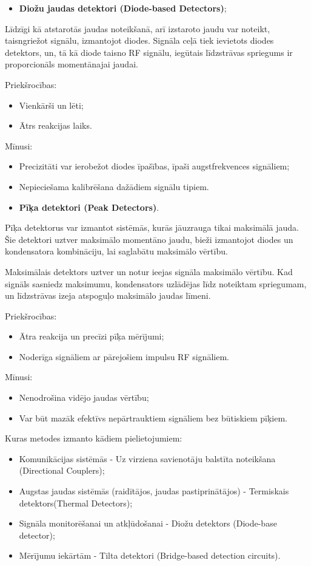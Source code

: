 \begin{itemize}
    \item \textbf{Diožu jaudas detektori (Diode-based Detectors)};
\end{itemize}
Līdzīgi kā atstarotās jaudas noteikšanā, arī izstaroto jaudu var noteikt, taisngriežot signālu, izmantojot diodes. Signāla ceļā tiek ievietots diodes detektors, un, tā kā diode taisno RF signālu, iegūtais līdzstrāvas spriegums ir proporcionāls momentānajai jaudai.

Priekšrocības:
\begin{itemize}
    \item Vienkārši un lēti;
    \item Ātrs reakcijas laiks.
\end{itemize}
Mīnusi:
\begin{itemize}
    \item Precizitāti var ierobežot diodes īpašības, īpaši augstfrekvences signāliem;
    \item Nepieciešama kalibrēšana dažādiem signālu tipiem.
\end{itemize}

\begin{itemize}
    \item \textbf{Pīķa detektori (Peak Detectors)}.
\end{itemize}
Pīķa detektorus var izmantot sistēmās, kurās jāuzrauga tikai maksimālā jauda. Šie detektori uztver maksimālo momentāno jaudu, bieži izmantojot diodes un kondensatora kombināciju, lai saglabātu maksimālo vērtību.

Maksimālais detektors uztver un notur ieejas signāla maksimālo vērtību. Kad signāls sasniedz maksimumu, kondensators uzlādējas līdz noteiktam spriegumam, un līdzstrāvas izeja atspoguļo maksimālo jaudas līmeni.

Priekšrocības:
\begin{itemize}
    \item Ātra reakcija un precīzi pīķa mērījumi;
    \item Noderīga signāliem ar pārejošiem impulsu RF signāliem.
\end{itemize}
Mīnusi:
\begin{itemize}
    \item Nenodrošina vidējo jaudas vērtību;
    \item Var būt mazāk efektīvs nepārtrauktiem signāliem bez būtiskiem pīķiem.
\end{itemize}

Kuras metodes izmanto kādiem pielietojumiem:
\begin{itemize}
    \item Komunikācijas sistēmās - Uz virziena savienotāju balstīta noteikšana (Directional Couplers);
    \item Augstas jaudas sistēmās (raidītājos, jaudas pastiprinātājos) - Termiskais detektors(Thermal Detectors);
    \item Signāla monitorēšanai un atkļūdošanai - Diožu detektors (Diode-base detector);
    \item Mērījumu iekārtām - Tilta detektori (Bridge-based detection circuits).
\end{itemize}

